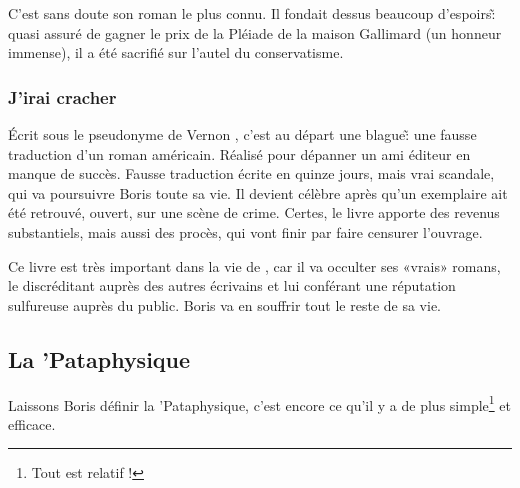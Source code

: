 C'est sans doute son roman le plus connu. Il fondait dessus beaucoup d'espoirs\~: quasi
assuré de gagner le prix de la Pléiade de la maison Gallimard (un honneur immense),
il a été sacrifié sur l'autel du conservatisme.

\subsubsection{J'irai cracher}

Écrit sous le pseudonyme de Vernon , c'est au départ une blague\~: une fausse
traduction d'un roman américain. Réalisé pour dépanner un ami éditeur en manque de succès.
Fausse traduction écrite en quinze jours, mais vrai scandale, qui va poursuivre Boris
toute sa vie. Il devient célèbre après qu'un exemplaire ait été retrouvé, ouvert, sur une scène de crime.
Certes, le livre apporte des revenus substantiels, mais aussi des procès, qui
vont finir par faire censurer l'ouvrage.


Ce livre est très important dans la vie de \BV, car il va occulter ses «vrais» romans,
le discréditant auprès des autres écrivains et lui conférant une réputation sulfureuse
auprès du public. Boris va en souffrir tout le reste de sa vie.

\subsection{La 'Pataphysique}

Laissons Boris définir la 'Pataphysique, c'est encore ce qu'il y
a de plus simple\footnote{Tout est relatif !} et efficace.

